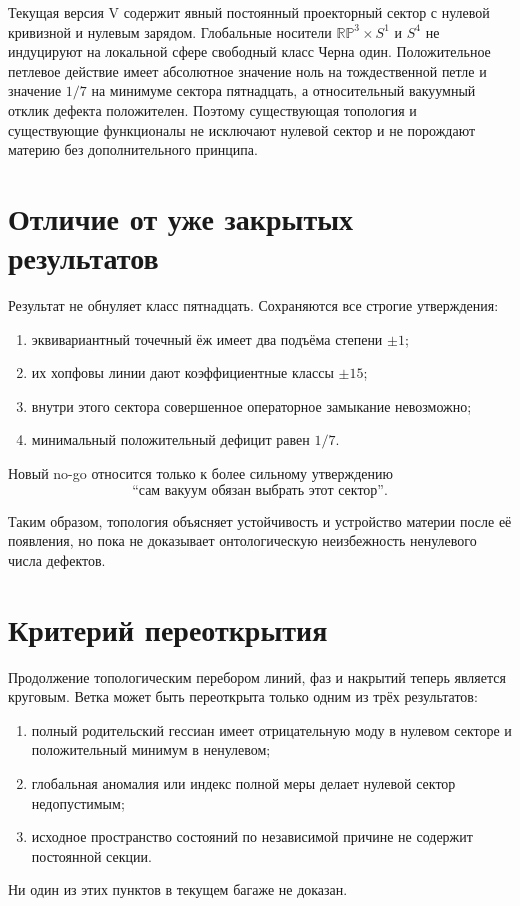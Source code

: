 \begin{theorem}
Текущая версия V содержит явный постоянный проекторный сектор с нулевой
кривизной и нулевым зарядом. Глобальные носители $\mathbb{RP}^3\times S^1$
и $S^4$ не индуцируют на локальной сфере свободный класс Черна один.
Положительное петлевое действие имеет абсолютное значение ноль на
тождественной петле и значение $1/7$ на минимуме сектора пятнадцать, а
относительный вакуумный отклик дефекта положителен. Поэтому существующая
топология и существующие функционалы не исключают нулевой сектор и не
порождают материю без дополнительного принципа.
\end{theorem}

\section{Отличие от уже закрытых результатов}

Результат не обнуляет класс пятнадцать. Сохраняются все строгие утверждения:
\begin{enumerate}
 \item эквивариантный точечный ёж имеет два подъёма степени $\pm1$;
 \item их хопфовы линии дают коэффициентные классы $\pm15$;
 \item внутри этого сектора совершенное операторное замыкание невозможно;
 \item минимальный положительный дефицит равен $1/7$.
\end{enumerate}
Новый no-go относится только к более сильному утверждению
\begin{equation}
 \text{``сам вакуум обязан выбрать этот сектор''}.
\end{equation}

Таким образом, топология объясняет устойчивость и устройство материи после
её появления, но пока не доказывает онтологическую неизбежность ненулевого
числа дефектов.

\section{Критерий переоткрытия}

Продолжение топологическим перебором линий, фаз и накрытий теперь является
круговым. Ветка может быть переоткрыта только одним из трёх результатов:
\begin{enumerate}
 \item полный родительский гессиан имеет отрицательную моду в нулевом
 секторе и положительный минимум в ненулевом;
 \item глобальная аномалия или индекс полной меры делает нулевой сектор
 недопустимым;
 \item исходное пространство состояний по независимой причине не содержит
 постоянной секции.
\end{enumerate}
Ни один из этих пунктов в текущем багаже не доказан.

